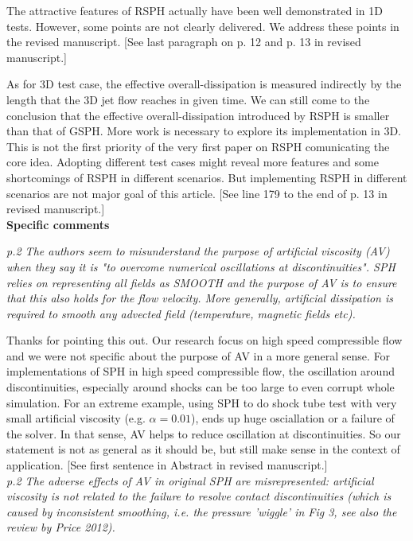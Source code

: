 \documentclass[10pt,a4paper]{article}
\begin{document}
The attractive features of RSPH actually have been well demonstrated in 1D tests. However, some points are not clearly delivered. We address these points in the revised manuscript.
[See last paragraph on p. 12 and p. 13 in revised manuscript.] 

As for 3D test case, the effective overall-dissipation is measured indirectly by the length that the 3D jet flow reaches in given time. We can still come to the conclusion that the effective overall-dissipation introduced by RSPH is smaller than that of GSPH. More work is necessary to explore its implementation in 3D. This is not the first priority of the very first paper on RSPH comunicating the core idea. Adopting different test cases might reveal more features and some shortcomings of RSPH in different scenarios. But implementing RSPH in different scenarios are not major goal of this article.
[See line 179 to the end of p. 13 in revised manuscript.]
\\[12pt]

\textbf{\large Specific comments}

\textit{p.2 The authors seem to misunderstand the purpose of artificial viscosity (AV) when they say it is "to overcome numerical oscillations at
discontinuities". SPH relies on representing all fields as SMOOTH and the purpose of AV is to ensure that this also holds for the flow velocity.
More generally, artificial dissipation is required to smooth any advected field (temperature, magnetic fields etc).}

Thanks for pointing this out. Our research focus on high speed compressible flow and we were not specific about the purpose of AV in a more general sense. For implementations of SPH in high speed compressible flow, the oscillation around discontinuities, especially around shocks can be too large to even corrupt whole simulation. For an extreme example, using SPH to do shock tube test with very small artificial viscosity (e.g. $\alpha = 0.01$), ends up huge osciallation or a failure of the solver. In that sense, AV helps to reduce oscillation at discontinuities. So our statement is not as general as it should be, but still make sense in the context of application.
[See first sentence in Abstract in revised manuscript.]
\\[3pt]

\textit{p.2 The adverse effects of AV in original SPH are misrepresented: artificial viscosity is not related to the failure to resolve contact discontinuities (which is caused by inconsistent smoothing, i.e. the pressure 'wiggle' in Fig 3, see also the review by Price 2012).}
\end{document}
